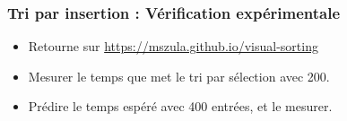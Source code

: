 \documentclass[aspectratio=169]{beamer}
\begin{document}
\begin{frame}
  \frametitle{Tri par insertion : Vérification expérimentale}
  \begin{itemize}
  \item Retourne sur \alert{\url{https://mszula.github.io/visual-sorting}}
  \item Mesurer le temps que met le tri par sélection avec 200.
  \item Prédire le temps espéré avec 400 entrées, et le mesurer.
  \end{itemize}
\end{frame}
\end{document}
